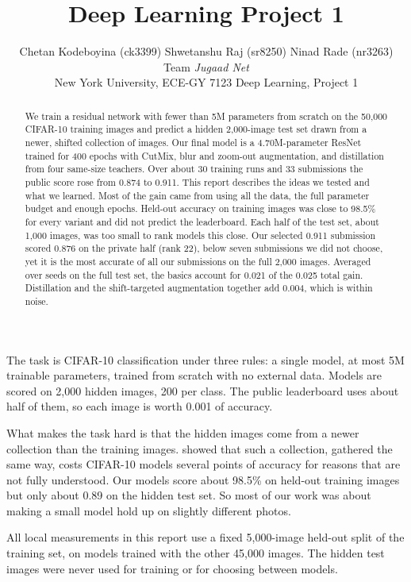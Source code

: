 \documentclass[letterpaper,10pt,twocolumn]{article}
\title{\Large\bfseries Deep Learning Project 1}
\author{Chetan Kodeboyina (ck3399) \quad Shwetanshu Raj (sr8250) \quad Ninad Rade (nr3263)\\ Team \textit{Jugaad Net} \\ New York University, ECE-GY 7123 Deep Learning, Project 1}
\date{}
\makeatletter
\renewcommand\section{\@startsection{section}{1}{\z@}{-1.6ex plus -.4ex}{0.8ex}{\normalfont\large\bfseries\centering}}
\makeatother
\begin{document}
\maketitle

\begin{abstract}
We train a residual network with fewer than 5M parameters from scratch on the 50,000 CIFAR-10 training images and predict a hidden 2,000-image test set drawn from a newer, shifted collection of images. Our final model is a 4.70M-parameter ResNet trained for 400 epochs with CutMix, blur and zoom-out augmentation, and distillation from four same-size teachers. Over about 30 training runs and 33 submissions the public score rose from 0.874 to 0.911. This report describes the ideas we tested and what we learned. Most of the gain came from using all the data, the full parameter budget and enough epochs. Held-out accuracy on training images was close to 98.5\% for every variant and did not predict the leaderboard. Each half of the test set, about 1,000 images, was too small to rank models this close. Our selected 0.911 submission scored 0.876 on the private half (rank 22), below seven submissions we did not choose, yet it is the most accurate of all our submissions on the full 2,000 images. Averaged over seeds on the full test set, the basics account for 0.021 of the 0.025 total gain. Distillation and the shift-targeted augmentation together add 0.004, which is within noise.
\end{abstract}

\section{Introduction}
The task is CIFAR-10 classification \citep{krizhevsky2009} under three rules: a single model, at most 5M trainable parameters, trained from scratch with no external data. Models are scored on 2,000 hidden images, 200 per class. The public leaderboard uses about half of them, so each image is worth 0.001 of accuracy.

What makes the task hard is that the hidden images come from a newer collection than the training images. \citet{recht2018} showed that such a collection, gathered the same way, costs CIFAR-10 models several points of accuracy for reasons that are not fully understood. Our models score about 98.5\% on held-out training images but only about 0.89 on the hidden test set. So most of our work was about making a small model hold up on slightly different photos.

All local measurements in this report use a fixed 5,000-image held-out split of the training set, on models trained with the other 45,000 images. The hidden test images were never used for training or for choosing between models.
\end{document}
